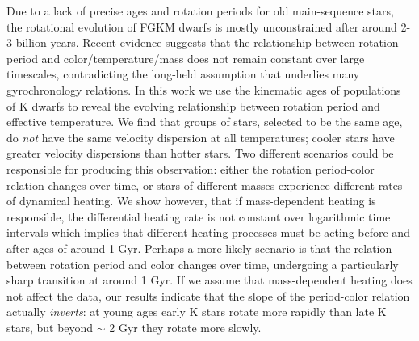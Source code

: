 
Due to a lack of precise ages and rotation periods for old main-sequence
stars, the rotational evolution of FGKM dwarfs is mostly unconstrained
after around 2-3 billion years.
Recent evidence suggests that the relationship between rotation period and
color/temperature/mass does not remain constant over large timescales,
contradicting the long-held assumption that underlies many gyrochronology
relations.
In this work we use the kinematic ages of populations of K dwarfs to reveal
the evolving relationship between rotation period and effective temperature.
We find that groups of stars, selected to be the same age, do {\it not} have
the same velocity dispersion at all temperatures; cooler stars have greater
velocity dispersions than hotter stars.
Two different scenarios could be responsible for producing this observation:
either the rotation period-color relation changes over time, or stars of
different masses experience different rates of dynamical heating.
We show however, that if mass-dependent heating is responsible, the
differential heating rate is not constant over logarithmic time intervals
which implies that different heating processes must be acting before and after
ages of around 1 Gyr.
Perhaps a more likely scenario is that the relation between rotation period
and color changes over time, undergoing a particularly sharp transition at
around 1 Gyr.
If we assume that mass-dependent heating does not affect the data, our results
indicate that the slope of the period-color relation actually {\it inverts}:
at young ages early K stars rotate more rapidly than late K stars, but beyond
$\sim$ 2 Gyr they rotate more slowly.
